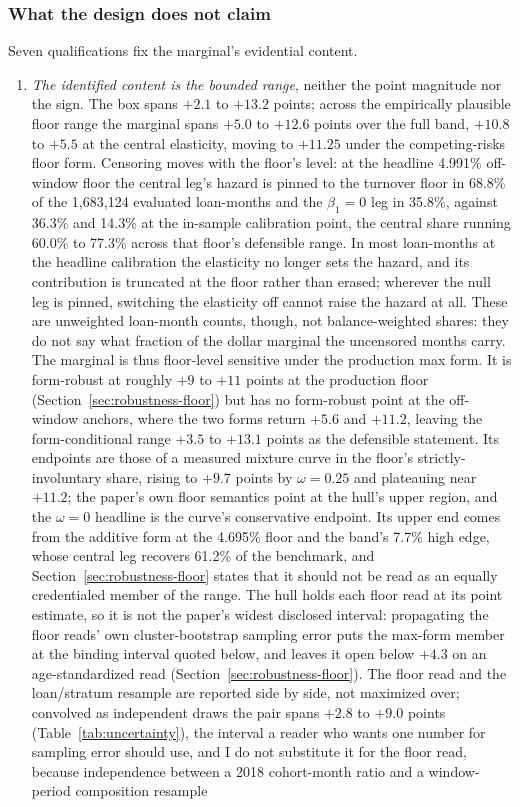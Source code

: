 \subsubsection{What the design does not claim}

Seven qualifications fix the marginal's evidential content.

\begin{enumerate}

\item \emph{The identified content is the bounded range}, neither the point magnitude nor the sign. The box spans $+2.1$ to $+13.2$ points; across the empirically plausible floor range the marginal spans $+5.0$ to $+12.6$ points over the full band, $+10.8$ to $+5.5$ at the central elasticity, moving to $+11.25$ under the competing-risks floor form. Censoring moves with the floor's level: at the headline 4.991\% off-window floor the central leg's hazard is pinned to the turnover floor in 68.8\% of the 1,683,124 evaluated loan-months and the $\beta_1 = 0$ leg in 35.8\%, against 36.3\% and 14.3\% at the in-sample calibration point, the central share running 60.0\% to 77.3\% across that floor's defensible range. In most loan-months at the headline calibration the elasticity no longer sets the hazard, and its contribution is truncated at the floor rather than erased; wherever the null leg is pinned, switching the elasticity off cannot raise the hazard at all. These are unweighted loan-month counts, though, not balance-weighted shares: they do not say what fraction of the dollar marginal the uncensored months carry. The marginal is thus floor-level sensitive under the production max form. It is form-robust at roughly $+9$ to $+11$ points at the production floor (Section~\ref{sec:robustness-floor}) but has no form-robust point at the off-window anchors, where the two forms return $+5.6$ and $+11.2$, leaving the form-conditional range $+3.5$ to $+13.1$ points as the defensible statement. Its endpoints are those of a measured mixture curve in the floor's strictly-involuntary share, rising to $+9.7$ points by $\omega = 0.25$ and plateauing near $+11.2$; the paper's own floor semantics point at the hull's upper region, and the $\omega = 0$ headline is the curve's conservative endpoint. Its upper end comes from the additive form at the 4.695\% floor and the band's 7.7\% high edge, whose central leg recovers 61.2\% of the benchmark, and Section~\ref{sec:robustness-floor} states that it should not be read as an equally credentialed member of the range. The hull holds each floor read at its point estimate, so it is not the paper's widest disclosed interval: propagating the floor reads' own cluster-bootstrap sampling error puts the max-form member at the binding interval quoted below, and leaves it open below $+4.3$ on an age-standardized read (Section~\ref{sec:robustness-floor}). The floor read and the loan/stratum resample are reported side by side, not maximized over; convolved as independent draws the pair spans $+2.8$ to $+9.0$ points (Table~\ref{tab:uncertainty}), the interval a reader who wants one number for sampling error should use, and I do not substitute it for the floor read, because independence between a 2018 cohort-month ratio and a window-period composition resample 
\end{enumerate}
